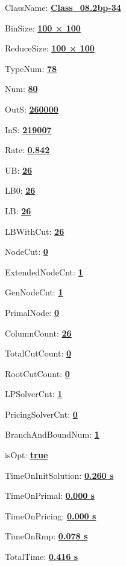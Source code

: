 \documentclass[11pt]{article}
\begin{document}
\pagestyle{empty}


ClassName: \underline{\textbf{Class_08.2bp-34}}
\par
BinSize: \underline{\textbf{100 × 100}}
\par
ReduceSize: \underline{\textbf{100 × 100}}
\par
TypeNum: \underline{\textbf{78}}
\par
Num: \underline{\textbf{80}}
\par
OutS: \underline{\textbf{260000}}
\par
InS: \underline{\textbf{219007}}
\par
Rate: \underline{\textbf{0.842}}
\par
UB: \underline{\textbf{26}}
\par
LB0: \underline{\textbf{26}}
\par
LB: \underline{\textbf{26}}
\par
LBWithCut: \underline{\textbf{26}}
\par
NodeCut: \underline{\textbf{0}}
\par
ExtendedNodeCnt: \underline{\textbf{1}}
\par
GenNodeCnt: \underline{\textbf{1}}
\par
PrimalNode: \underline{\textbf{0}}
\par
ColumnCount: \underline{\textbf{26}}
\par
TotalCutCount: \underline{\textbf{0}}
\par
RootCutCount: \underline{\textbf{0}}
\par
LPSolverCnt: \underline{\textbf{1}}
\par
PricingSolverCnt: \underline{\textbf{0}}
\par
BranchAndBoundNum: \underline{\textbf{1}}
\par
isOpt: \underline{\textbf{true}}
\par
TimeOnInitSolution: \underline{\textbf{0.260 s}}
\par
TimeOnPrimal: \underline{\textbf{0.000 s}}
\par
TimeOnPricing: \underline{\textbf{0.000 s}}
\par
TimeOnRmp: \underline{\textbf{0.078 s}}
\par
TotalTime: \underline{\textbf{0.416 s}}
\par
\newpage


\end{document}
